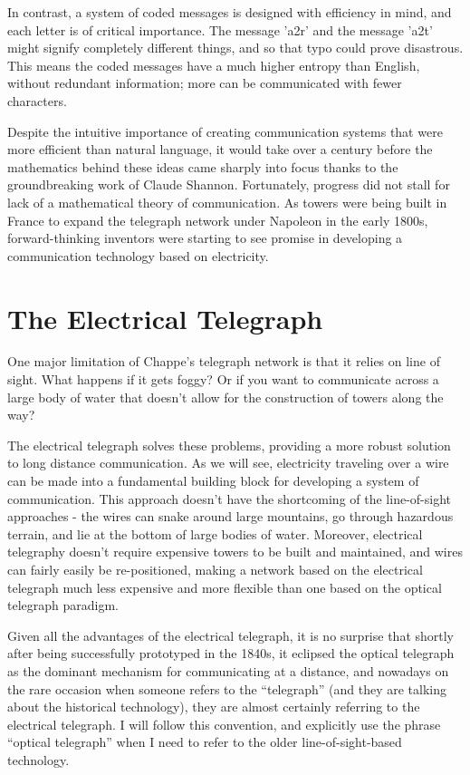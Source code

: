 \documentclass[UTF8]{book}
\begin{document}
\begin{CJK}{UTF8}{gbsn}
In contrast, a system of coded messages is designed with efficiency in mind, and each letter is of critical importance. The message 'a2r' and the message 'a2t' might signify completely different things, and so that typo could prove disastrous. This means the coded messages have a much higher entropy than English, without redundant information; more can be communicated with fewer characters.

Despite the intuitive importance of creating communication systems that were more efficient than natural language, it would take over a century before the mathematics behind these ideas came sharply into focus thanks to the groundbreaking work of Claude Shannon. Fortunately, progress did not stall for lack of a mathematical theory of communication. As towers were being built in France to expand the telegraph network under Napoleon in the early 1800s, forward-thinking inventors were starting to see promise in developing a communication technology based on electricity.

\chapter{The Electrical Telegraph}

One major limitation of Chappe's telegraph network is that it relies on line of sight. What happens if it gets foggy? Or if you want to communicate across a large body of water that doesn't allow for the construction of towers along the way?

The electrical telegraph solves these problems, providing a more robust solution to long distance communication. As we will see, electricity traveling over a wire can be made into a fundamental building block for developing a system of communication. This approach doesn't have the shortcoming of the line-of-sight approaches - the wires can snake around large mountains, go through hazardous terrain, and lie at the bottom of large bodies of water. Moreover, electrical telegraphy doesn't require expensive towers to be built and maintained, and wires can fairly easily be re-positioned, making a network based on the electrical telegraph much less expensive and more flexible than one based on the optical telegraph paradigm.

Given all the advantages of the electrical telegraph, it is no surprise that shortly after being successfully prototyped in the 1840s, it eclipsed the optical telegraph as the dominant mechanism for communicating at a distance, and nowadays on the rare occasion when someone refers to the ``telegraph'' (and they are talking about the historical technology), they are almost certainly referring to the electrical telegraph. I will follow this convention, and explicitly use the phrase ``optical telegraph'' when I need to refer to the older line-of-sight-based technology.


\end{CJK}
\end{document}
